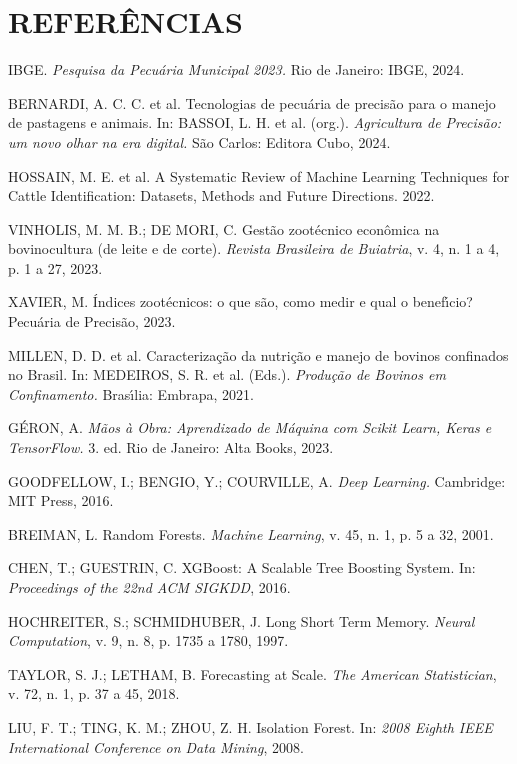 \documentclass[12pt,a4paper]{article}
\begin{document}
\section*{REFER\^ENCIAS}

\noindent IBGE. \textit{Pesquisa da Pecu\'aria Municipal 2023.} Rio de Janeiro: IBGE, 2024.

\noindent BERNARDI, A. C. C. et al. Tecnologias de pecu\'aria de precis\~ao para o manejo de pastagens e animais. In: BASSOI, L. H. et al. (org.). \textit{Agricultura de Precis\~ao: um novo olhar na era digital.} S\~ao Carlos: Editora Cubo, 2024.

\noindent HOSSAIN, M. E. et al. A Systematic Review of Machine Learning Techniques for Cattle Identification: Datasets, Methods and Future Directions. 2022.

\noindent VINHOLIS, M. M. B.; DE MORI, C. Gest\~ao zoot\'ecnico econ\^omica na bovinocultura (de leite e de corte). \textit{Revista Brasileira de Buiatria}, v. 4, n. 1 a 4, p. 1 a 27, 2023.

\noindent XAVIER, M. \'Indices zoot\'ecnicos: o que s\~ao, como medir e qual o benef\'{\i}cio? Pecu\'aria de Precis\~ao, 2023.

\noindent MILLEN, D. D. et al. Caracteriza\c c\~ao da nutri\c c\~ao e manejo de bovinos confinados no Brasil. In: MEDEIROS, S. R. et al. (Eds.). \textit{Produ\c c\~ao de Bovinos em Confinamento.} Bras\'{\i}lia: Embrapa, 2021.

\noindent G\'ERON, A. \textit{M\~aos \`a Obra: Aprendizado de M\'aquina com Scikit Learn, Keras e TensorFlow.} 3. ed. Rio de Janeiro: Alta Books, 2023.

\noindent GOODFELLOW, I.; BENGIO, Y.; COURVILLE, A. \textit{Deep Learning.} Cambridge: MIT Press, 2016.

\noindent BREIMAN, L. Random Forests. \textit{Machine Learning}, v. 45, n. 1, p. 5 a 32, 2001.

\noindent CHEN, T.; GUESTRIN, C. XGBoost: A Scalable Tree Boosting System. In: \textit{Proceedings of the 22nd ACM SIGKDD}, 2016.

\noindent HOCHREITER, S.; SCHMIDHUBER, J. Long Short Term Memory. \textit{Neural Computation}, v. 9, n. 8, p. 1735 a 1780, 1997.

\noindent TAYLOR, S. J.; LETHAM, B. Forecasting at Scale. \textit{The American Statistician}, v. 72, n. 1, p. 37 a 45, 2018.

\noindent LIU, F. T.; TING, K. M.; ZHOU, Z. H. Isolation Forest. In: \textit{2008 Eighth IEEE International Conference on Data Mining}, 2008.
\end{document}
